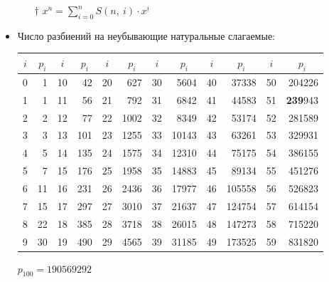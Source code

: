 \documentclass[10pt, portrait,letterpaper]{article}
\begin{document}
\begin{itemize}
\begin{itemize}
        \item[$\dagger$] $x^n = \sum\limits_{i = 0}^n S(n, ~i) \cdot x^{\underline i}$    
    
    \end{itemize}
        
    \item Число разбиений на неубывающие натуральные слагаемые:
    
    {
    \newcommand\bn[1]{\multicolumn{1}{|c|}{#1}}
    \newcommand\cn[1]{\multicolumn{1}{c|}{#1}}
    \begin{center}
        \begin{tabular}{|r|r|r|r|r|r|r|r|r|r|r|r|}
        \hline
            \bn{$i$} & \cn{$p_i$} & \cn{$i$} & \cn{$p_i$} & \cn{$i$} & \cn{$p_i$} & \cn{$i$} & \cn{$p_i$} & \cn{$i$} & \cn{$p_i$} & \cn{$i$} & \cn{$p_i$}\\
        \hline
             0 & \num{1} & 10 & \num{42} & 20 & \num{627} & 30 & \num{5604} & 40 & \num{37338} & 50 & \num{204226}\\
             1 & \num{1} & 11 & \num{56} & 21 & \num{792} & 31 & \num{6842} & 41 & \num{44583} & 51 & \textbf{239}943\\
             2 & \num{2} & 12 & \num{77} & 22 & \num{1002} & 32 & \num{8349} & 42 & \num{53174} & 52 & \num{281589}\\
             3 & \num{3} & 13 & \num{101} & 23 & \num{1255} & 33 & \num{10143} & 43 & \num{63261} & 53 & \num{329931}\\
             4 & \num{5} & 14 & \num{135} & 24 & \num{1575} & 34 & \num{12310} & 44 & \num{75175} & 54 & \num{386155}\\
             5 & \num{7} & 15 & \num{176} & 25 & \num{1958} & 35 & \num{14883} & 45 & \num{89134} & 55 & \num{451276}\\
             6 & \num{11} & 16 & \num{231} & 26 & \num{2436} & 36 & \num{17977} & 46 & \num{105558} & 56 & \num{526823}\\
             7 & \num{15} & 17 & \num{297} & 27 & \num{3010} & 37 & \num{21637} & 47 & \num{124754} & 57 & \num{614154}\\
             8 & \num{22} & 18 & \num{385} & 28 & \num{3718} & 38 & \num{26015} & 48 & \num{147273} & 58 & \num{715220}\\
             9 & \num{30} & 19 & \num{490} & 29 & \num{4565} & 39 & \num{31185} & 49 & \num{173525} & 59 & \num{831820}\\
        \hline
        \end{tabular}
    \end{center}
    }
    \begin{center}
            $p_{100} = \num{190569292}$
    \end{center}            
  

\end{itemize}
\end{document}
